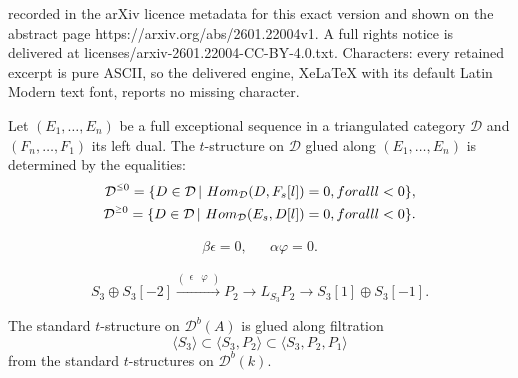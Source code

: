 \documentclass[10pt,a4paper]{amsart}
\newcommand{\Hom}{\mathop{\textrm{Hom}}\nolimits}
\newcommand{\dD}{{\mathcal{D}}}
\newcommand{\f}{\varphi}
\newcommand{\gge}{\mbox{\raisebox{0.25ex}{${\scriptscriptstyle\ge}$}}}
\newcommand{\kk}{\mathbbm{k}}
\newcommand{\lle}{\mbox{\raisebox{0.25ex}{${\scriptscriptstyle\le}$}}}
\newcommand{\tr}{{\mbox{$t$-struc}\-tu\-r}}
\begin{document}
recorded in the arXiv licence metadata for this exact version and shown on the abstract page https://arxiv.org/abs/2601.22004v1. A full rights notice is delivered at licenses/arxiv-2601.22004-CC-BY-4.0.txt. Characters: every retained excerpt is pure ASCII, so the delivered engine, XeLaTeX with its default Latin Modern text font, reports no missing character.
\begin{LEM}\label{lem_glued_t-str}
	Let $(E_1, \ldots, E_n ) $ be a full exceptional sequence in a triangulated category $\dD$ and $( F_n, \ldots, F_1 )$ its left dual. The \tr e on $\dD$ glued along $(E_1, \ldots, E_n ) $
	is determined by the equalities:
	\begin{align*}
	\dD^{\lle 0} = \{D\in \dD\,|\, \Hom_{\dD}(D, F_s[l])=0, \textrm{ for all } l<0
	\},\\
	\dD^{\gge 0} = \{D\in \dD\,|\, \Hom_{\dD}(E_s, D[l])=0, \textrm{ for all } l<0
	\}.
	\end{align*}
\end{LEM}

\begin{align}\label{eqtn_relations}
&\beta \epsilon = 0,& &\alpha\f =0.&
\end{align}

	\begin{equation}\label{eqtn_L_S_3_P_2}
	S_3 \oplus S_3[-2] \xrightarrow{\left(\begin{array}{cc}\epsilon & \f 
		\end{array}\right)} P_2 \rightarrow L_{S_3}P_2\rightarrow S_3[1]\oplus S_3[-1].
	\end{equation}

\begin{PROP}
	The standard \tr e on $\dD^b(A)$ is glued along filtration 
	$$
	\langle S_3 \rangle  \subset \langle S_3, P_2 \rangle \subset \langle S_3, P_2, P_1 \rangle
	$$
	from the standard \tr es on $\dD^b(k)$.
\end{PROP}
\end{document}
